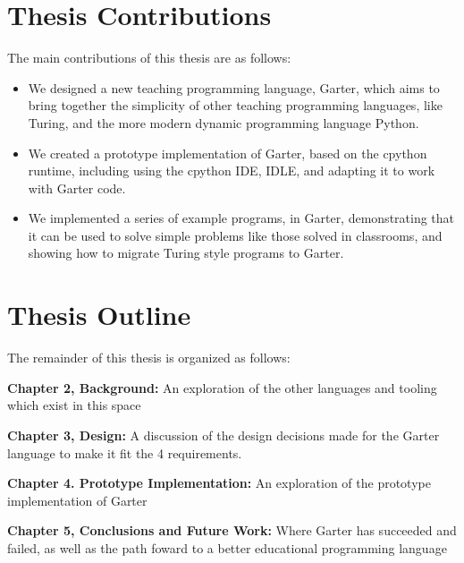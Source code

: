 \section{Thesis Contributions}

The main contributions of this thesis are as follows:

\begin{itemize}
\item We designed a new teaching programming language, Garter, which aims to
bring together the simplicity of other teaching programming languages, like
Turing, and the more modern dynamic programming language Python.
\item We created a prototype implementation of Garter, based on the cpython
runtime, including using the cpython IDE, IDLE, and adapting it to work with
Garter code.
\item We implemented a series of example programs, in Garter, demonstrating
that it can be used to solve simple problems like those solved in classrooms,
and showing how to migrate Turing style programs to Garter.
\end{itemize}


\section{Thesis Outline}
The remainder of this thesis is organized as follows:

\noindent\textbf{Chapter 2, Background:} An exploration of the other languages and tooling which exist in this space

\noindent\textbf{Chapter 3, Design:} A discussion of the design decisions made for the Garter language to make it fit the 4 requirements.

\noindent\textbf{Chapter 4. Prototype Implementation:} An exploration of the prototype implementation of Garter

\noindent\textbf{Chapter 5, Conclusions and Future Work:} Where Garter has succeeded and failed, as well as the path foward to a better educational programming language
